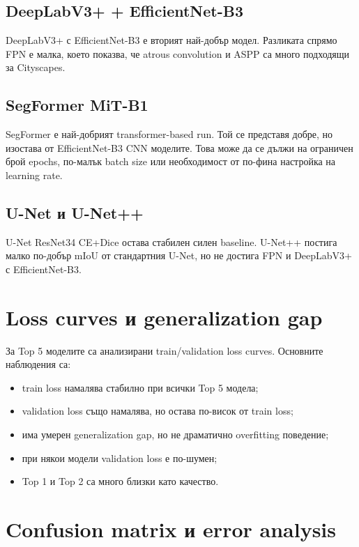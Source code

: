 \documentclass[12pt,a4paper]{article}
\begin{document}
\subsection{DeepLabV3+ + EfficientNet-B3}

DeepLabV3+ с EfficientNet-B3 е вторият най-добър модел. Разликата спрямо FPN е малка, което показва, че atrous convolution и ASPP са много подходящи за Cityscapes.

\subsection{SegFormer MiT-B1}

SegFormer е най-добрият transformer-based run. Той се представя добре, но изостава от EfficientNet-B3 CNN моделите. Това може да се дължи на ограничен брой epochs, по-малък batch size или необходимост от по-фина настройка на learning rate.

\subsection{U-Net и U-Net++}

U-Net ResNet34 CE+Dice остава стабилен силен baseline. U-Net++ постига малко по-добър mIoU от стандартния U-Net, но не достига FPN и DeepLabV3+ с EfficientNet-B3.

\section{Loss curves и generalization gap}

За Top 5 моделите са анализирани train/validation loss curves. Основните наблюдения са:

\begin{itemize}
  \item train loss намалява стабилно при всички Top 5 модела;
  \item validation loss също намалява, но остава по-висок от train loss;
  \item има умерен generalization gap, но не драматично overfitting поведение;
  \item при някои модели validation loss е по-шумен;
  \item Top 1 и Top 2 са много близки като качество.
\end{itemize}

\section{Confusion matrix и error analysis}
\end{document}
